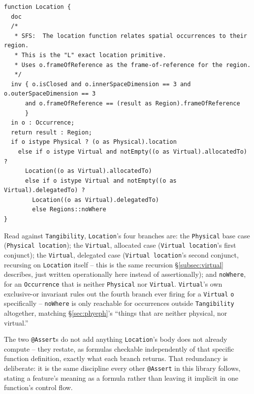 \begin{lstlisting}
function Location {
  doc
  /*
   * SFS:  The location function relates spatial occurrences to their region.
   * This is the "L" exact location primitive.
   * Uses o.frameOfReference as the frame-of-reference for the region.
   */
  inv { o.isClosed and o.innerSpaceDimension == 3 and o.outerSpaceDimension == 3
      and o.frameOfReference == (result as Region).frameOfReference
      }
  in o : Occurrence;
  return result : Region;
  if o istype Physical ? (o as Physical).location
    else if o istype Virtual and notEmpty((o as Virtual).allocatedTo) ? 
      Location((o as Virtual).allocatedTo)
      else if o istype Virtual and notEmpty((o as Virtual).delegatedTo) ? 
        Location((o as Virtual).delegatedTo)
        else Regions::noWhere
}
\end{lstlisting}

\pn Read against \texttt{Tangibility}, \texttt{Location}'s four branches are: the \texttt{Physical}
base case (\texttt{Physical location}); the \texttt{Virtual}, allocated case
(\texttt{Virtual location}'s first conjunct); the \texttt{Virtual}, delegated case
(\texttt{Virtual location}'s second conjunct, recursing on \texttt{Location} itself -- this is the
same recursion \S\ref{subsec:virtual} describes, just written operationally here instead of
assertionally); and \texttt{noWhere}, for an \texttt{Occurrence} that is neither
\texttt{Physical} nor \texttt{Virtual}.  \texttt{Virtual}'s own exclusive-or invariant rules out the
fourth branch ever firing for a \texttt{Virtual} \texttt{o} specifically -- \texttt{noWhere} is only
reachable for occurrences outside \texttt{Tangibility} altogether, matching \S\ref{sec:phyeph}'s
``things that are neither physical, nor virtual.''

\pn The two \texttt{@Assert}s do not add anything \texttt{Location}'s body does not already compute
-- they restate, as formulas checkable independently of that specific function definition, exactly
what each branch returns.  That redundancy is deliberate: it is the same discipline every other
\texttt{@Assert} in this library follows, stating a feature's meaning as a formula rather than
leaving it implicit in one function's control flow.

